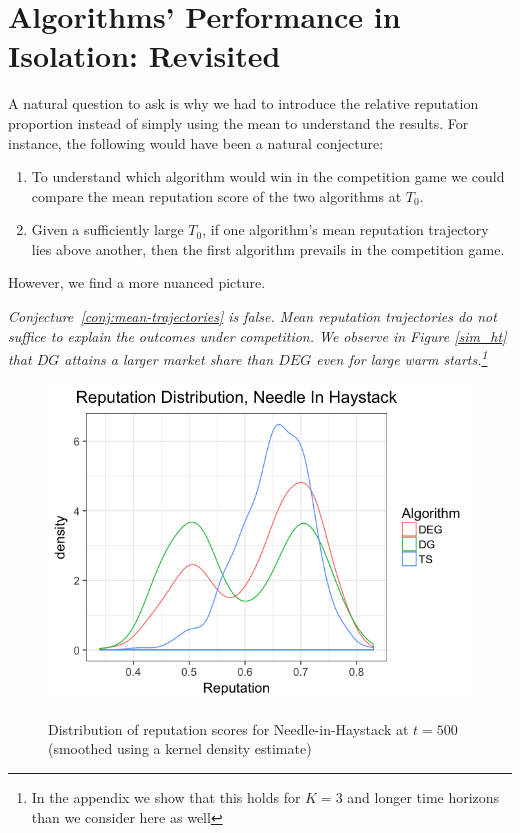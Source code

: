 \documentclass[../competing_bandits.tex]{subfiles}
\begin{document}
\section{Algorithms' Performance in Isolation: Revisited}\label{section:revisited}

A natural question to ask is why we had to introduce the relative reputation proportion instead of simply using the mean to understand the results. For instance, the following would have been a natural conjecture:
\begin{conjecture}\label{conj:mean-trajectories}
\begin{enumerate}
\item To understand which algorithm would win in the competition game we could compare the mean reputation score of the two algorithms at $T_0$.
\item Given a sufficiently large $T_0$, if one algorithm's mean reputation trajectory lies above another, then the first algorithm prevails in the competition game.
\end{enumerate}
\end{conjecture}

However, we find a more nuanced picture. 

\begin{finding}
\textit{
Conjecture~\ref{conj:mean-trajectories} is false. Mean reputation trajectories do not suffice to explain the outcomes under competition. We observe in Figure \ref{sim_ht} that $DG$ attains a larger market share than $DEG$ even for large warm starts.\footnote{In the appendix we show that this holds for $K = 3$ and longer time horizons than we consider here as well}}
\end{finding}

\begin{figure}[ht]
\caption{Distribution of reputation scores for Needle-in-Haystack at $t=500$ (smoothed using a kernel density estimate)}
\includegraphics[scale=0.35]{figures/rep_distribution_nih}
\label{rep_dist_nih}
\end{figure}
\end{document}
